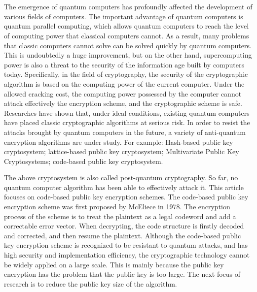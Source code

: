 \newpage
\vspace{-1cm}
\chapter*{}
\vspace{-0.5cm}
The emergence of quantum computers has profoundly affected the development of various fields of computers. The important advantage of quantum computers is quantum parallel computing, which allows quantum computers to reach the level of computing power that classical computers cannot. As a result, many problems that classic computers cannot solve can be solved quickly by quantum computers. This is undoubtedly a huge improvement, but on the other hand, supercomputing power is also a threat to the security of the information age built by computers today. Specifically, in the field of cryptography, the security of the cryptographic algorithm is based on the computing power of the current computer. Under the allowed cracking cost, the computing power possessed by the computer cannot attack effectively the encryption scheme, and the cryptographic scheme is safe. Researches have shown that, under ideal conditions, existing quantum computers have placed classic cryptographic algorithms at serious risk. In order to resist the attacks brought by quantum computers in the future, a variety of anti-quantum encryption algorithms are under study. For example: Hash-based public key cryptosystem;  lattice-based public key cryptosystem; Multivariate Public Key Cryptosystems; code-based public key cryptosystem.

The above cryptosystem is also called post-quantum cryptography. So far, no quantum computer algorithm has been able to effectively attack it. This article focuses on code-based public key encryption schemes. The code-based public key encryption scheme was first proposed by McEliece in 1978\cite{Mceliece1978A}. The encryption process of the scheme is to treat the plaintext as a legal codeword and add a correctable error vector. When decrypting, the code structure is firstly decoded and corrected, and then resume the plaintext. Although the code-based public key encryption scheme is recognized to be resistant to quantum attacks, and has high security and implementation efficiency, the cryptographic technology cannot be widely applied on a large scale. This is mainly because the public key encryption has the problem that the public key is too large. The next focus of research is to reduce the public key size of the algorithm.


